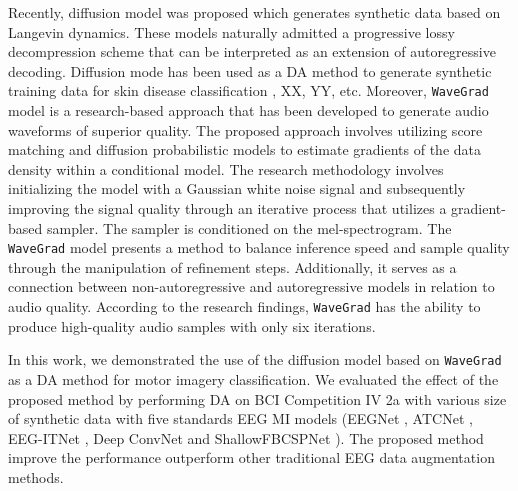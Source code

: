 \documentclass[runningheads]{llncs}
\begin{document}
Recently, diffusion model \cite{ho2020denoising} was proposed which generates synthetic data based on Langevin dynamics. These models naturally admitted a progressive lossy decompression scheme that can be interpreted as an extension of autoregressive decoding. 
Diffusion mode has been used as a DA method to generate synthetic training data for skin disease classification \cite{akrout2023diffusion}, XX, YY, etc.   
Moreover, \texttt{WaveGrad} \cite{chen2020wavegrad} model is a research-based approach that has been developed to generate audio waveforms of superior quality. The proposed approach involves utilizing score matching \cite{song2020sliced} and diffusion probabilistic models to estimate gradients of the data density within a conditional model. The research methodology involves initializing the model with a Gaussian white noise signal and subsequently improving the signal quality through an iterative process that utilizes a gradient-based sampler. The sampler is conditioned on the mel-spectrogram. The \texttt{WaveGrad} model presents a method to balance inference speed and sample quality through the manipulation of refinement steps. Additionally, it serves as a connection between non-autoregressive and autoregressive models in relation to audio quality. According to the research findings, \texttt{WaveGrad} has the ability to produce high-quality audio samples with only six iterations.

In this work,  we demonstrated the use of the diffusion model based on \texttt{WaveGrad} \cite{chen2020wavegrad} as a DA method for motor imagery classification. We evaluated the effect of the proposed method by performing DA on BCI Competition IV 2a \cite{brunner2008bci} with various size of synthetic data with five standards EEG MI models (EEGNet \cite{lawhern2018eegnet}, ATCNet \cite{altaheri2022physics}, EEG-ITNet \cite{salami2022eeg}, Deep ConvNet \cite{schirrmeister2017deep} and ShallowFBCSPNet \cite{schirrmeister2017deep}). The proposed method improve the performance outperform other traditional EEG data augmentation methods. 
\end{document}
